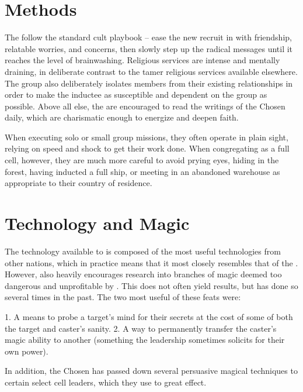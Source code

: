 \documentclass[blue]{GL2020}
\begin{document}
\section*{Methods}
The \pGoaties{} follow the standard cult playbook -- ease the new recruit in with friendship, relatable worries, and concerns, then slowly step up the radical messages until it reaches the level of brainwashing. Religious services are intense and mentally draining, in deliberate contrast to the tamer religious services available elsewhere. The group also deliberately isolates members from their existing relationships in order to make the inductee as susceptible and dependent on the group as possible. Above all else, the \pGoaties{} are encouraged to read the writings of the Chosen daily, which are charismatic enough to energize and deepen faith.

When executing solo or small group missions, they often operate in plain sight, relying on speed and shock to get their work done. When congregating as a full cell, however, they are much more careful to avoid prying eyes, hiding in the forest, having inducted a full ship, or meeting in an abandoned warehouse as appropriate to their country of residence.

\section*{Technology and Magic}
The technology available to \pGoaties{} is composed of the most useful technologies from other nations, which in practice means that it most closely resembles that of the \pTech{}. However, \pGoaties{} also heavily encourages research into branches of magic deemed too dangerous and unprofitable by \pTech{}. This does not often yield results, but has done so several times in the past. The two most useful of these feats were: 

1. A means to probe a target's mind for their secrets at the cost of some of both the target and caster's sanity.
2. A way to permanently transfer the caster's magic ability to another (something the leadership sometimes solicits for their own power).

In addition, the Chosen has passed down several persuasive magical techniques to certain select cell leaders, which they use to great effect.
\end{document}
